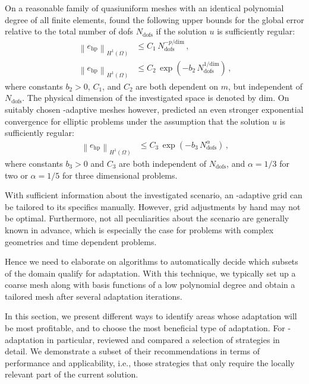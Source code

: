 On a reasonable family of quasiuniform meshes with an identical polynomial degree of all finite elements, \textcite[Sec.~1]{babuska1996} found the following upper bounds for the global error relative to the total number of \glspl{dof} $N_\text{dofs}$ if the solution $u$ is sufficiently regular:
\begin{align}
\label{eq:errorbound_ana} \left\|e_\text{hp}\right\|_{H^{1}(\Omega)} &\leq C_1 \, N_\text{dofs}^{- p/\text{dim}} \,\text{,} \\
\left\|e_\text{hp}\right\|_{H^{1}(\Omega)} &\leq C_2 \, \exp\left(- b_2 \, N_\text{dofs}^{1/\text{dim}} \right) \,\text{,}
\end{align}
where constants $b_2 > 0$, $C_1$, and $C_2$ are both dependent on $m$, but independent of $N_\text{dofs}$. The physical dimension of the investigated space is denoted by $\text{dim}$.
On suitably chosen \hp-adaptive meshes however, \textcites[Thm.~5.1]{guo1986}[Thm.~2.5.2, Thm.~3.5.1]{babuska1996} predicted an even stronger exponential convergence for elliptic problems under the assumption that the solution $u$ is sufficiently regular:
\begin{align}
\label{eq:errorbound_exp} \left\|e_\text{hp}\right\|_{H^{1}(\Omega)} &\leq C_3 \, \exp\left(- b_3 \, N_\text{dofs}^\alpha \right) \,\text{,}
\end{align}
where constants $b_3 > 0$ and $C_3$ are both independent of $N_\text{dofs}$, and $\alpha = 1/3$ for two or $\alpha = 1/5$ for three dimensional problems.

With sufficient information about the investigated scenario, an \hp-adaptive grid can be tailored to its specifics manually. However, grid adjustments by hand may not be optimal. Furthermore, not all peculiarities about the scenario are generally known in advance, which is especially the case for problems with complex geometries and time dependent problems.

Hence we need to elaborate on algorithms to automatically decide which subsets of the domain qualify for adaptation. With this technique, we typically set up a coarse mesh along with basis functions of a low polynomial degree and obtain a tailored mesh after several adaptation iterations.

In this section, we present different ways to identify areas whose adaptation will be most profitable, and to choose the most beneficial type of adaptation. For \hp-adaptation in particular, \textcite{mitchell2014} reviewed and compared a selection of strategies in detail. We demonstrate a subset of their recommendations in terms of performance and applicability, i.e., those strategies that only require the locally relevant part of the current solution.



